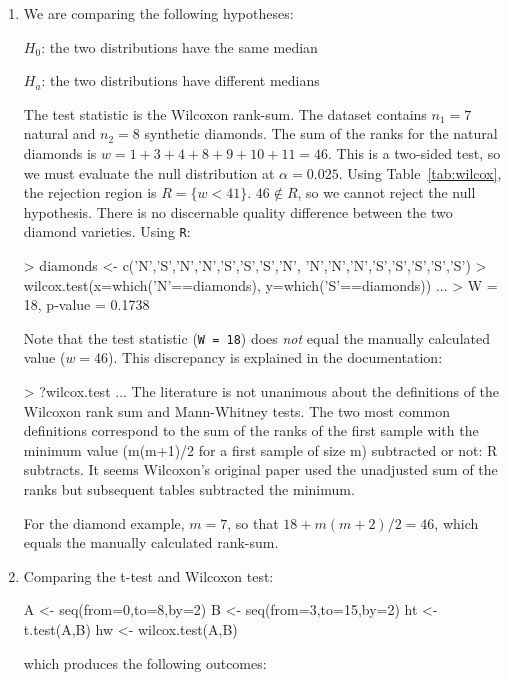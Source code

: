 \begin{enumerate}
\item We are comparing the following hypotheses:
  
  $H_0$: the two distributions have the same median
  
  $H_a$: the two distributions have different medians
  
  The test statistic is the Wilcoxon rank-sum.  The dataset contains
  $n_1=7$ natural and $n_2=8$ synthetic diamonds.  The sum of the
  ranks for the natural diamonds is $w = 1 + 3 + 4 + 8 + 9 + 10 + 11 =
  46$.  This is a two-sided test, so we must evaluate the null
  distribution at $\alpha=0.025$.  Using Table~\ref{tab:wilcox}, the
  rejection region is $R=\{w<{41}\}$. $46\notin{R}$, so we cannot
  reject the null hypothesis. There is no discernable quality
  difference between the two diamond varieties. Using \texttt{R}:

\begin{console}
> diamonds <- c('N','S','N','N','S','S','S','N',
                'N','N','N','S','S','S','S','S')
> wilcox.test(x=which('N'==diamonds),
              y=which('S'==diamonds))
...
> W = 18, p-value = 0.1738
\end{console}

Note that the test statistic (\texttt{W = 18}) does \emph{not} equal
the manually calculated value ($w = 46$). This discrepancy is
explained in the documentation:

\begin{console}
> ?wilcox.test
...
The literature is not unanimous about the definitions of the
Wilcoxon rank sum and Mann-Whitney tests.  The two most common
definitions correspond to the sum of the ranks of the first sample
with the minimum value (m(m+1)/2 for a first sample of size m)
subtracted or not: R subtracts.  It seems Wilcoxon's original
paper used the unadjusted sum of the ranks but subsequent tables
subtracted the minimum.
\end{console}

For the diamond example, $m=7$, so that $18 + m(m+2)/2 = 46$, which
equals the manually calculated rank-sum.

\item Comparing the t-test and Wilcoxon test:

\begin{script}
A <- seq(from=0,to=8,by=2)
B <- seq(from=3,to=15,by=2)
ht <- t.test(A,B)
hw <- wilcox.test(A,B)
\end{script}

\noindent which produces the following outcomes:


\end{enumerate}
